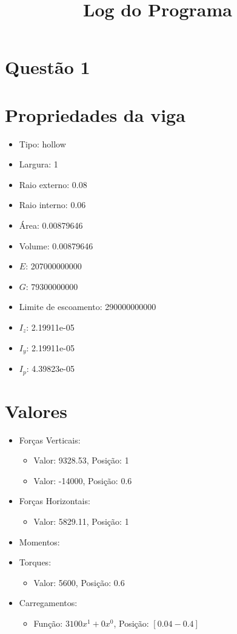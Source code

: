 \documentclass[10pt]{article}
\date{}
\begin{document}
\title{Log do Programa}
\author{}
\maketitle
\section*{Questão 1}
\section*{Propriedades da viga}
\begin{itemize}
\item Tipo: hollow
\item Largura: 1
\item Raio externo: 0.08
\item Raio interno: 0.06
\item Área: 0.00879646
\item Volume: 0.00879646
\item \(E\): 207000000000
\item \(G\): 79300000000
\item Limite de escoamento: 290000000000
\item \(I_{z}\): 2.19911e-05
\item \(I_{y}\): 2.19911e-05
\item \(I_{p}\): 4.39823e-05
\end{itemize}
\section*{Valores}
\begin{itemize}
\item Forças Verticais:
\begin{itemize}
\item Valor: 9328.53, Posição: 1
\item Valor: -14000, Posição: 0.6
\end{itemize}
\item Forças Horizontais:
\begin{itemize}
\item Valor: 5829.11, Posição: 1
\end{itemize}
\item Momentos:
\begin{itemize}
\end{itemize}
\item Torques:
\begin{itemize}
\item Valor: 5600, Posição: 0.6
\end{itemize}
\item Carregamentos:
\begin{itemize}
\item Função: \( 3100 x^{1} +  0 x^{0}\), Posição: \([0.04-0.4]\)\end{itemize}
\end{itemize}
\end{document}
